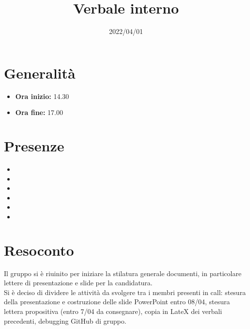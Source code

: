 \documentclass{classes/base}
\title{Verbale interno}
\date{2022/04/01}
\author{\marcob}
\renewcommand{\maketitle}{
    
}
\begin{document}
    \maketitle

    \section*{Generalità}
    \begin{itemize}
        \item \textbf{Ora inizio:} 14.30
        \item \textbf{Ora fine:} 17.00
    \end{itemize}

    \section*{Presenze}
    \begin{itemize}
        \item \marcob
        \item \angela
        \item \giulio
        \item \matteo
        \item \marcov
        \item \ruth
    \end{itemize}
    
    \section*{Resoconto}
    Il gruppo si è riuinito per iniziare la stilatura generale documenti, in particolare lettere di presentazione e slide per la candidatura.\\
    Si è deciso di dividere le attività da svolgere tra i membri presenti in call: stesura della presentazione e costruzione delle slide PowerPoint entro 08/04, stesura lettera propositiva (entro 7/04 da consegnare), copia in LateX dei verbali precedenti, debugging GitHub di gruppo.
\end{document}
